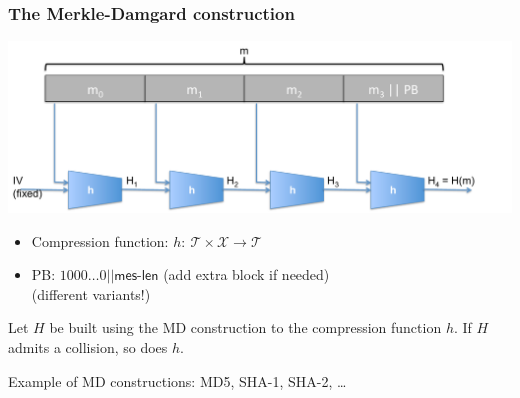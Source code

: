 \documentclass[aspectratio=169, lualatex, handout, 10pt,dvipsnames,svgnames]{beamer} %
\def\envert#1{\textcolor{vert}{#1}}
\def\enrouge#1{\textcolor{rouge}{#1}}
\newcommand{\Tcal}{\mathcal{T}}
\newcommand{\Xcal}{\mathcal{X}}
\begin{document}
\begin{frame}

  \frametitle{The Merkle-Damgard construction}
\vspace{-0.7cm}
  \includegraphics[scale=0.4]{Images/MerkleDamgard.pdf}

  \begin{itemize}
  \item Compression function: $h:\ \Tcal \times \Xcal \rightarrow \Tcal$
  \item PB: $1000 \dots 0 || \mathsf{mes\text{-}len}$ (add extra block if needed) \\ \enrouge{(different variants!)}
  \end{itemize}
  \medskip{}
  \begin{theorem}
    Let $H$ be built using the MD construction to the compression
    function $h$. If $H$ admits a collision, so does $h$.
  \end{theorem}
  \medskip{}

  \envert{Example of MD constructions: MD5, SHA-1, SHA-2, \dots}

\end{frame}
\end{document}
